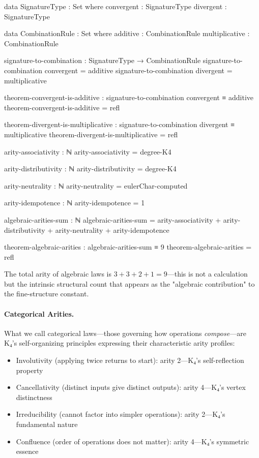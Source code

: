 \documentclass[11pt,a4paper]{book}
\begin{document}
\begin{code}
data SignatureType : Set where
  convergent : SignatureType
  divergent  : SignatureType

data CombinationRule : Set where
  additive       : CombinationRule
  multiplicative : CombinationRule

signature-to-combination : SignatureType → CombinationRule
signature-to-combination convergent = additive
signature-to-combination divergent  = multiplicative

theorem-convergent-is-additive : signature-to-combination convergent ≡ additive
theorem-convergent-is-additive = refl

theorem-divergent-is-multiplicative : signature-to-combination divergent ≡ multiplicative
theorem-divergent-is-multiplicative = refl

arity-associativity : ℕ
arity-associativity = degree-K4

arity-distributivity : ℕ
arity-distributivity = degree-K4

arity-neutrality : ℕ
arity-neutrality = eulerChar-computed

arity-idempotence : ℕ
arity-idempotence = 1

algebraic-arities-sum : ℕ
algebraic-arities-sum = arity-associativity + arity-distributivity 
                      + arity-neutrality + arity-idempotence

theorem-algebraic-arities : algebraic-arities-sum ≡ 9
theorem-algebraic-arities = refl
\end{code}

The total arity of algebraic laws is $3 + 3 + 2 + 1 = 9$—this is not a calculation but the intrinsic structural count that appears as the "algebraic contribution" to the fine-structure constant.

\paragraph{Categorical Arities.}
What we call categorical laws—those governing how operations \emph{compose}—are K₄'s self-organizing principles expressing their characteristic arity profiles:
\begin{itemize}
\item Involutivity (applying twice returns to start): arity 2—K₄'s self-reflection property
\item Cancellativity (distinct inputs give distinct outputs): arity 4—K₄'s vertex distinctness
\item Irreducibility (cannot factor into simpler operations): arity 2—K₄'s fundamental nature
\item Confluence (order of operations does not matter): arity 4—K₄'s symmetric essence
\end{itemize}
\end{document}
